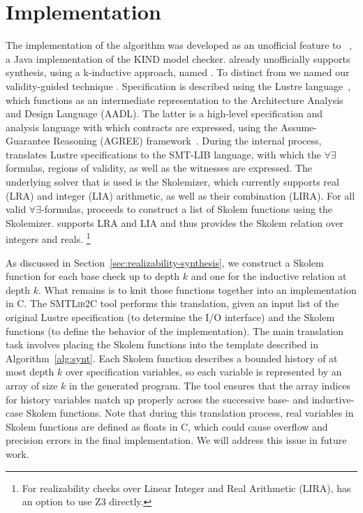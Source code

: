 \section{Implementation}
\label{sec:impl}

The implementation of the algorithm was developed as an
unofficial feature to \jkind~\cite{jkind}, a Java implementation of the
\textsc{KIND} model checker. \jkind already unofficially supports synthesis,
using a k-inductive approach, named \jkindsynt. To distinct from \jkindsynt
we named our validity-guided technique \jkindvgsynt. Specification is described
using the Lustre language~\cite{lustrev6}, which functions as an intermediate
representation to the Architecture Analysis and Design Language (\textsc{AADL}).
The latter is a high-level specification and analysis language with which
contracts are expressed, using the Assume-Guarantee Reasoning (\textsc{AGREE})
framework~\cite{NFM2012:CoGaMiWhLaLu}.
During the internal process, \jkindvgsynt translates Lustre specifications to
the SMT-LIB language, with which the $\forall\exists$ formulas, regions of
validity, as well as the witnesses are expressed. The underlying solver that is
used is the \aeval Skolemizer, which currently supports real (LRA) and integer
(LIA) arithmetic, as well as their combination (LIRA).
%
For all valid $\forall\exists$-formulas, \jkindsynt proceeds to construct a list of
Skolem functions using the \aeval Skolemizer.
\aeval supports LRA  and LIA and thus provides the Skolem relation over integers and reals.%
\footnote{For realizability checks over Linear Integer and Real
  Arithmetic (LIRA), \jkind has an option to use \textsc{Z3} directly.}

As discussed in Section~\ref{sec:realizability-synthesis}, we construct a Skolem function for each base check up to depth $k$ and one for the inductive relation at depth $k$.  What remains is to knit those functions together into an implementation in C.  The \textsc{SMTLib2C} tool performs this translation, given an input list of the original Lustre specification (to determine the I/O interface) and the Skolem functions (to define the behavior of the implementation).  The main translation task involves placing the Skolem functions into the template described in Algorithm~\ref{alg:synt}.  Each Skolem function describes a bounded history of at most depth $k$ over specification variables, so each variable is represented by an array of size $k$ in the generated program.  The tool ensures that the array indices for history variables match up properly across the successive base- and inductive-case Skolem functions.  Note that during this translation process, real
variables in Skolem functions are defined as floats in C, which could cause 
overflow and precision errors in the final implementation.  We will address this issue in future work.





